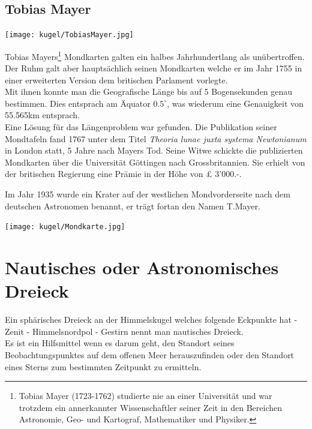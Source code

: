 \begin{refsection}
\subsection{Tobias Mayer}

\begin{center}
        \texttt{[image: kugel/TobiasMayer.jpg]}
\end{center}

Tobias Mayers\footnote{%
Tobias Mayer (1723-1762) studierte nie an einer Universität und war trotzdem ein annerkannter Wissenschaftler seiner Zeit in den Bereichen Astronomie, Geo- und Kartograf, Mathematiker und Physiker.} 
 Mondkarten galten ein halbes Jahrhundertlang als unübertroffen. Der Ruhm galt aber hauptsächlich seinen Mondkarten welche er im Jahr 1755 in einer erweiterten Version dem britischen Parlament vorlegte.\\
Mit ihnen konnte man die Geografische Länge bis auf 5 Bogensekunden genau bestimmen. Dies entsprach am Äquator $0.5 ^{\circ}$, was wiederum eine Genauigkeit von 55.565km entsprach.\\
Eine Lösung für das Längenproblem war gefunden. Die Publikation seiner Mondtafeln fand 1767 unter dem Titel \textit{Theoria lunae juxta systema Newtonianum} in London statt, 5 Jahre nach Mayers Tod. 
Seine Witwe schickte die publizierten Mondkarten über die Universität Göttingen nach Grossbritannien. Sie erhielt von der britischen Regierung eine Prämie in der Höhe von £ 3’000.-.

Im Jahr 1935 wurde ein Krater auf der westlichen Mondvorderseite nach dem deutschen Astronomen benannt, er trägt fortan den Namen T.Mayer.

\begin{center}
        \texttt{[image: kugel/Mondkarte.jpg]}
\end{center}


\section{Nautisches oder Astronomisches Dreieck}
Ein sphärisches Dreieck an der Himmelskugel welches folgende Eckpunkte hat
- Zenit
- Himmelsnordpol
- Gestirn
nennt man nautisches Dreieck.\\

Es ist ein Hilfsmittel wenn es darum geht, den Standort seines Beobachtungspunktes auf dem offenen Meer herauszufinden oder den Standort eines Sterns zum bestimmten Zeitpunkt zu ermitteln.


\end{refsection}

